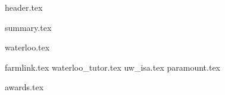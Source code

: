 \documentclass[11pt]{article}
\begin{document}
{header.tex}

{summary.tex}

{waterloo.tex}

{farmlink.tex}
{waterloo_tutor.tex}
{uw_isa.tex}
{paramount.tex}

{awards.tex}
\end{document}
